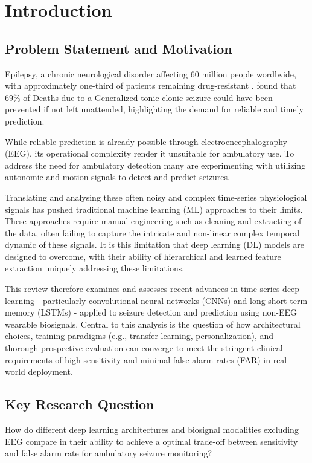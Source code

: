 \section{Introduction}

\subsection{Problem Statement and Motivation}

Epilepsy, a chronic neurological disorder affecting 60 million people wordlwide,
with approximately one-third of patients remaining drug-resistant \parencite{husseinFocalNonFocalEpilepsy2018}.
\cite{sveinssonClinicalRiskFactors2020} found that 69\% of Deaths due to a Generalized
tonic-clonic seizure could have been prevented if not left unattended, highlighting the demand
for reliable and timely prediction.

While reliable prediction is already possible through electroencephalography (EEG),
its operational complexity render it unsuitable for ambulatory use.
To address the need for ambulatory detection many are experimenting with
utilizing autonomic and motion signals to detect and predict seizures.

Translating and analysing these often noisy and complex time-series physiological
signals has pushed traditional machine learning (ML) approaches to their limits.
These approaches require manual engineering such as cleaning and extracting of the data,
often failing to capture the intricate and non-linear complex temporal dynamic of these
signals. It is this limitation that deep learning (DL) models are designed to overcome, with their ability of hierarchical and learned feature
extraction uniquely addressing these limitations.

This review therefore examines and assesses recent advances in time-series
deep learning - particularly convolutional neural networks (CNNs)
and long short term memory (LSTMs) -
applied to seizure detection and prediction using non-EEG wearable biosignals.
Central to this analysis is the question of how architectural choices, training paradigms
(e.g., transfer learning, personalization), and thorough prospective evaluation
can converge to meet the stringent clinical requirements of high sensitivity
and minimal false alarm rates (FAR) in real-world deployment.

\subsection{Key Research Question}
How do different deep learning architectures and biosignal modalities excluding EEG
compare in their ability to achieve a optimal trade-off between 
sensitivity and false alarm rate for ambulatory seizure monitoring?
